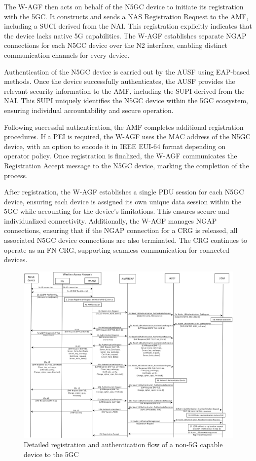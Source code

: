The W-AGF then acts on behalf of the N5GC device to initiate its registration with the 5GC. It constructs and sends a \ac{NAS} Registration Request to the AMF, including a SUCI derived from the NAI. This registration explicitly indicates that the device lacks native 5G capabilities. The W-AGF establishes separate NGAP connections for each N5GC device over the N2 interface, enabling distinct communication channels for every device.

Authentication of the N5GC device is carried out by the AUSF using EAP-based methods. Once the device successfully authenticates, the AUSF provides the relevant security information to the AMF, including the SUPI derived from the NAI. This SUPI uniquely identifies the N5GC device within the 5GC ecosystem, ensuring individual accountability and secure operation.

Following successful authentication, the AMF completes additional registration procedures. If a PEI is required, the W-AGF uses the MAC address of the N5GC device, with an option to encode it in IEEE EUI-64 format depending on operator policy. Once registration is finalized, the W-AGF communicates the Registration Accept message to the N5GC device, marking the completion of the process.

After registration, the W-AGF establishes a single PDU session for each N5GC device, ensuring each device is assigned its own unique data session within the 5GC while accounting for the device's limitations. This ensures secure and individualized connectivity. Additionally, the W-AGF manages NGAP connections, ensuring that if the NGAP connection for a CRG is released, all associated N5GC device connections are also terminated. The CRG continues to operate as an FN-CRG, supporting seamless communication for connected devices.

\begin{figure}
    \centering
    \includegraphics[width=0.75\linewidth]{figs/Detailed registration and authentication flow of a non-5G capable device to the 5GC.png}
    \caption{Detailed registration and authentication flow of a non-5G capable device to the 5GC}
    \label{fig:Detailed registration and authentication flow of a non-5G capable device to the 5GC}
\end{figure}

